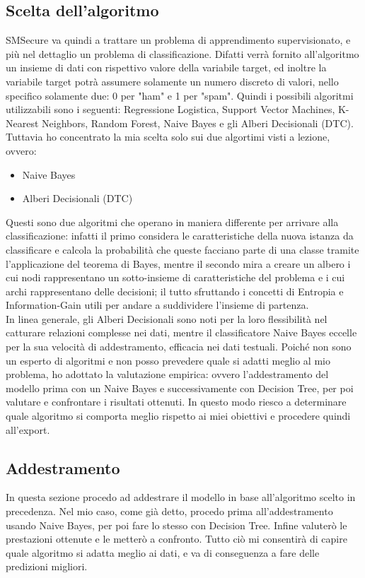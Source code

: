 \documentclass[]{article}
\begin{document}
            \subsection{Scelta dell'algoritmo}
                SMSecure va quindi a trattare un problema di apprendimento supervisionato, e più nel dettaglio un problema di classificazione. Difatti verrà fornito all'algoritmo un insieme di dati con rispettivo valore della variabile target, ed inoltre la variabile target potrà assumere solamente un numero discreto di valori, nello specifico solamente due: 0 per "ham" e 1 per "spam". Quindi i possibili algoritmi utilizzabili sono i seguenti: Regressione Logistica, Support Vector Machines, K-Nearest Neighbors, Random Forest, Naive Bayes e gli Alberi Decisionali (DTC).\\
                Tuttavia ho concentrato la mia scelta solo sui due algortimi visti a lezione, ovvero:
                \begin{itemize}
                    \item Naive Bayes
                    \item Alberi Decisionali (DTC)
                \end{itemize}
                Questi sono due algoritmi che operano in maniera differente per arrivare alla classificazione: infatti il primo considera le caratteristiche della nuova istanza da classificare e calcola la probabilità che queste facciano parte di una classe tramite l’applicazione del teorema di Bayes, mentre il secondo mira a creare un albero i cui nodi rappresentano un sotto-insieme di caratteristiche del problema e i cui archi rappresentano delle decisioni; il tutto sfruttando i concetti di Entropia e Information-Gain utili per andare a suddividere l'insieme di partenza.\\
                In linea generale, gli Alberi Decisionali sono noti per la loro flessibilità nel catturare relazioni complesse nei dati, mentre il classificatore Naive Bayes eccelle per la sua velocità di addestramento, efficacia nei dati testuali. Poiché non sono un esperto di algoritmi e non posso prevedere quale si adatti meglio al mio problema, ho adottato la valutazione empirica:  ovvero l'addestramento del modello prima con un Naive Bayes e successivamente con Decision Tree, per poi valutare e confrontare i risultati ottenuti. In questo modo riesco a determinare quale algoritmo si comporta meglio rispetto ai miei obiettivi e procedere quindi all'export.

            \subsection{Addestramento}
                In questa sezione procedo ad addestrare il modello in base all'algoritmo scelto in precedenza. Nel mio caso, come già detto,  procedo prima all'addestramento usando Naive Bayes, per poi fare lo stesso con Decision Tree. Infine valuterò le prestazioni ottenute e le metterò a confronto. Tutto ciò mi consentirà di capire quale algoritmo si adatta meglio ai dati, e va di conseguenza a fare delle predizioni migliori.\\
\end{document}
